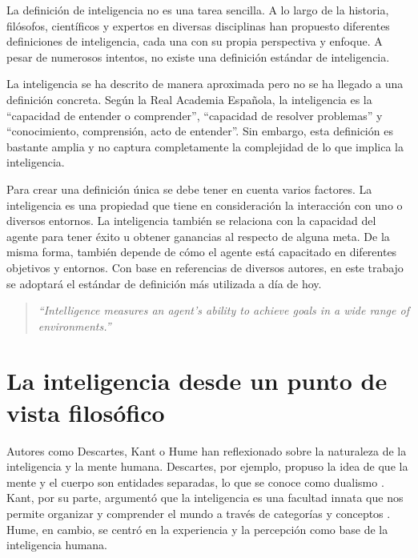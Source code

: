 \documentclass[11pt,a4paper,spanish]{book}
\numberwithin{equation}{chapter}
\numberwithin{figure}{chapter}
\begin{document}
La definición de inteligencia no es una tarea sencilla. A lo largo de la historia, filósofos, científicos y expertos en diversas disciplinas han propuesto 
diferentes definiciones de inteligencia, cada una con su propia perspectiva y enfoque. A pesar de numerosos intentos, no existe una definición estándar 
de inteligencia.

La inteligencia se ha descrito de manera aproximada pero no se ha llegado a una definición concreta. Según la Real Academia Española,
la inteligencia es la ``capacidad de entender o comprender'', ``capacidad de resolver problemas'' y ``conocimiento, comprensión, acto de entender''. 
Sin embargo, esta definición es bastante amplia y no captura completamente la complejidad de lo que implica la inteligencia.

Para crear una definición única se debe tener en cuenta varios factores. La inteligencia es una propiedad que tiene en consideración 
la interacción con uno o diversos entornos. La inteligencia también se relaciona con la capacidad del agente para tener éxito u obtener ganancias 
al respecto de alguna meta. De la misma forma, también depende de cómo el agente está capacitado en diferentes objetivos y entornos. Con base en
referencias de diversos autores, en este trabajo se adoptará el estándar de definición más utilizada a día de hoy.

\begin{quote}
\itshape
``Intelligence measures an agent's ability to achieve goals in a wide range of environments.''
\end{quote}

\begin{center}
\cite[p.~9, párr.~6]{legg2007collection}
\end{center}

\section{La inteligencia desde un punto de vista filosófico}

Autores como Descartes, Kant o Hume han reflexionado sobre la naturaleza de la inteligencia y la mente humana. Descartes, por ejemplo, propuso
la idea de que la mente y el cuerpo son entidades separadas, lo que se conoce como dualismo \cite{gonzalez2011descartes}. Kant, por su parte, argumentó que la inteligencia es una
facultad innata que nos permite organizar y comprender el mundo a través de categorías y conceptos \cite{waxman2014kant}. Hume, en cambio, se centró en la experiencia y
la percepción como base de la inteligencia humana.
\end{document}
